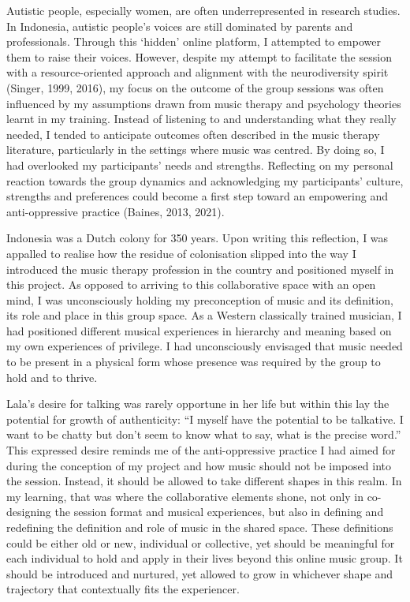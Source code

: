 \documentclass[authordate, empirical]{jote-new-article}
\begin{document}
	Autistic people, especially women, are often underrepresented in research studies. In Indonesia, autistic people's voices are still dominated by parents and professionals. Through this ‘hidden' online platform, I attempted to empower them to raise their voices. However, despite my attempt to facilitate the session with a resource-oriented approach and alignment with the neurodiversity spirit (Singer, 1999, 2016), my focus on the outcome of the group sessions was often influenced by my assumptions drawn from music therapy and psychology theories learnt in my training. Instead of listening to and understanding what they really needed, I tended to anticipate outcomes often described in the music therapy literature, particularly in the settings where music was centred. By doing so, I had overlooked my participants' needs and strengths. Reflecting on my personal reaction towards the group dynamics and acknowledging my participants' culture, strengths and preferences could become a first step toward an empowering and anti-oppressive practice (Baines, 2013, 2021).



	Indonesia was a Dutch colony for 350 years. Upon writing this reflection, I was appalled to realise how the residue of colonisation slipped into the way I introduced the music therapy profession in the country and positioned myself in this project. As opposed to arriving to this collaborative space with an open mind, I was unconsciously holding my preconception of music and its definition, its role and place in this group space. As a Western classically trained musician, I had positioned different musical experiences in hierarchy and meaning based on my own experiences of privilege. I had unconsciously envisaged that music needed to be present in a physical form whose presence was required by the group to hold and to thrive.



	Lala's desire for talking was rarely opportune in her life but within this lay the potential for growth of authenticity: “I myself have the potential to be talkative. I want to be chatty but don't seem to know what to say, what is the precise word.” This expressed desire reminds me of the anti-oppressive practice I had aimed for during the conception of my project and how music should not be imposed into the session. Instead, it should be allowed to take different shapes in this realm. In my learning, that was where the collaborative elements shone, not only in co-designing the session format and musical experiences, but also in defining and redefining the definition and role of music in the shared space. These definitions could be either old or new, individual or collective, yet should be meaningful for each individual to hold and apply in their lives beyond this online music group. It should be introduced and nurtured, yet allowed to grow in whichever shape and trajectory that contextually fits the experiencer.
\end{document}
